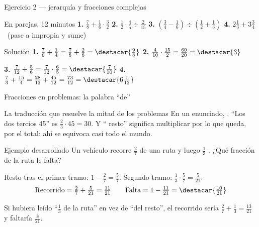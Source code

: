 \documentclass[aspectratio=169,10pt]{beamer}
\begin{document}
\begin{frame}{Ejercicio 2 — jerarquía y fracciones complejas}
  \scriptsize
  \begin{alertblock}{En parejas, 12 minutos}
    \tiny
    \textbf{1.} $\tfrac{7}{8}+\tfrac{1}{6}\cdot\tfrac{3}{2}$ \qquad
    \textbf{2.} $\tfrac{1}{2}\cdot\tfrac{4}{5}\div\tfrac{2}{15}$ \qquad
    \textbf{3.} $\left(\tfrac{3}{4}-\tfrac{1}{6}\right)
                 \div\left(\tfrac{1}{2}+\tfrac{1}{3}\right)$ \qquad
    \textbf{4.} $2\tfrac{1}{3}+3\tfrac{3}{4}$ \ (pase a impropia y sume)
  \end{alertblock}

  \vspace{0.04cm}
  \begin{block}{Solución}
    \tiny
    \textbf{1.} $\tfrac{7}{8}+\tfrac{1}{4}
    = \tfrac{7}{8}+\tfrac{2}{8} = \destacar{\tfrac{9}{8}}$ \qquad
    \textbf{2.} $\tfrac{4}{10}\cdot\tfrac{15}{2}
    = \tfrac{60}{20} = \destacar{3}$

    \vspace{0.08cm}
    \textbf{3.} $\tfrac{7}{12}\div\tfrac{5}{6}
    = \tfrac{7}{12}\cdot\tfrac{6}{5} = \destacar{\tfrac{7}{10}}$ \qquad
    \textbf{4.} $\tfrac{7}{3}+\tfrac{15}{4}
    = \tfrac{28}{12}+\tfrac{45}{12} = \tfrac{73}{12}
    = \destacar{6\tfrac{1}{12}}$
  \end{block}
\end{frame}

\begin{frame}{Fracciones en problemas: la palabra ``de''}
  \scriptsize
  \begin{block}{La traducción que resuelve la mitad de los problemas}
    \tiny
    En un enunciado, . ``Los dos
    tercios  45'' es $\tfrac{2}{3}\cdot 45 = 30$. Y ``
    resto'' significa multiplicar por lo que queda,  por el
    total: ahí se equivoca casi todo el mundo.
  \end{block}

  \vspace{0.1cm}
  \begin{exampleblock}{Ejemplo desarrollado}
    \tiny
    Un vehículo recorre $\tfrac{2}{7}$ de una ruta y luego $\tfrac{1}{3}$
    . ¿Qué fracción de la ruta le falta?

    \vspace{0.06cm}
    Resto tras el primer tramo: $1-\tfrac{2}{7} = \tfrac{5}{7}$.
    Segundo tramo: $\tfrac{1}{3}\cdot\tfrac{5}{7} = \tfrac{5}{21}$.
    \[ \text{Recorrido} = \tfrac{2}{7}+\tfrac{5}{21} = \tfrac{11}{21}
       \qquad
       \text{Falta} = 1-\tfrac{11}{21} = \destacar{\tfrac{10}{21}} \]
  \end{exampleblock}

  \vspace{0.05cm}
  {\tiny\color{uniGris} Si hubiera leído ``$\tfrac{1}{3}$ de la ruta'' en vez
  de ``del resto'', el recorrido sería $\tfrac{2}{7}+\tfrac{1}{3}
  =\tfrac{13}{21}$ y faltaría $\tfrac{8}{21}$. }
\end{frame}
\end{document}
